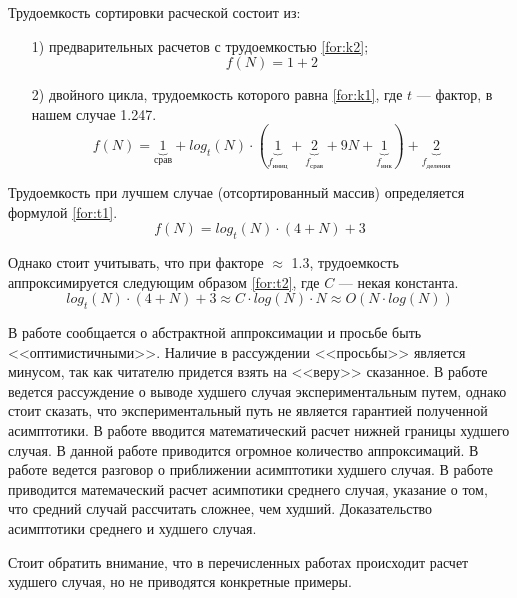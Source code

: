 Трудоемкость сортировки расческой состоит из:
\begin{enumerate}
	\item[1)] предварительных расчетов с трудоемкостью \ref{for:k2};
    \begin{equation}
    \label{for:k2}
        f(N) = 1 + 2
    \end{equation}
	\item[2)] двойного цикла, трудоемкость которого равна \ref{for:k1}, где $t$ --- фактор, в нашем случае 1.247. 
    \begin{equation}
    \label{for:k1}
        f(N) = \underbrace{1}_{\text{срав}} + log_t(N) \cdot (\underbrace{1}_{f_\text{иниц}} + \underbrace{2}_{f_\text{срав}} + 9N + \underbrace{1}_{f_\text{инк}}) + \underbrace{2}_{f_\text{деления}}
    \end{equation}
\end{enumerate}

Трудоемкость при лучшем случае (отсортированный массив) определяется формулой \ref{for:t1}.
\begin{equation}
\label{for:t1}
    f(N) = log_t(N) \cdot (4 + N) + 3
\end{equation}

Однако стоит учитывать, что при факторе $\approx$ 1.3, трудоемкость аппроксимируется следующим образом \ref{for:t2}, где $C$ --- некая константа. 
\begin{equation}
\label{for:t2}
    log_t(N) \cdot (4 + N) + 3 \approx C \cdot log(N) \cdot N \approx O(N \cdot log(N))
\end{equation}

В работе \cite{byte_ocr} сообщается о абстрактной аппроксимации и просьбе быть <<оптимистичными>>. 
Наличие в рассуждении <<просьбы>> является минусом, так как читателю придется взять на <<веру>> сказанное.
В работе \cite{comb_cocktail_counting_sort_compare} ведется рассуждение о выводе худшего случая экспериментальным
путем, однако стоит сказать, что экспериментальный путь не является гарантией полученной асимптотики.
В работе \cite{kolmogorov_complexity} вводится математический расчет нижней границы худшего случая. В данной 
работе приводится огромное количество аппроксимаций.
В работе \cite{simd} ведется разговор о приближении асимптотики худшего случая.
В работе \cite{dobosiewicz_shaker_sort} приводится матемаческий расчет асимпотики среднего случая, 
указание о том, что средний случай рассчитать сложнее, чем худший.
Доказательство асимптотики среднего и худшего случая.

Стоит обратить внимание, что в перечисленных работах происходит расчет худшего случая, но не приводятся конкретные примеры. 

